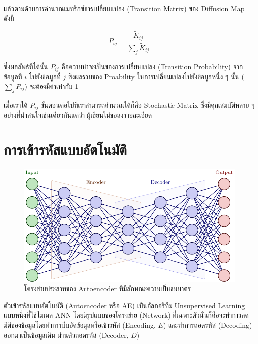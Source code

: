 \noindent แล้วตามด้วยการคำนวณเมทริกซ์การเปลี่ยนแปลง (Transition Matrix) ของ Diffusion Map ดังนี้

\begin{equation}
    P_{ij} = \frac{\tilde{K}_{ij}}{\sum_{j}\tilde{K}_{ij}}
\end{equation}

\noindent ซึ่งผลลัพธ์ที่ได้นั้น $P_{ij}$ คือความน่าจะเป็นของการเปลี่ยนแปลง (Transition Probability) จากข้อมูลที่ $i$ ไปยังข้อมูลที่ 
$j$ ซึ่งผลรวมของ Proability ในการเปลี่ยนแปลงไปยังข้อมูลหนึ่ง ๆ นั้น ($\sum_{j}P_{ij}$) จะต้องมีค่าเท่ากับ 1 

เมื่อเราได้ $P_{ij}$ ขั้นตอนต่อไปที่เราสามารถคำนวณได้ก็คือ Stochastic Matrix ซึ่งมีคุณสมบัติหลาย ๆ อย่างที่น่าสนใจเช่นเดียวกันแต่ว่า%
ผู้เขียนไม่ขอลงรายละเอียด 

\section{การเข้ารหัสแบบอัตโนมัติ}
\label{sec:autoencoder}

\begin{figure}[htbp]
    \centering
    \includegraphics[width=\linewidth]{fig/autoencoder.pdf}
    \caption{โครงข่ายประสาทของ Autoencoder ที่มีลักษณะความเป็นสมมาตร}
    \label{fig:autoencoder}
\end{figure}

ตัวเข้ารหัสแบบอัตโนมัติ (Autoencoder หรือ AE)\autocite{kramer1991} เป็นอัลกอริทึม Unsupervised Learning แบบหนึ่งที่ใช้โมเดล 
ANN โดยมีรูปแบบของโครงข่าย (Network) ที่เฉพาะตัวนั่นก็คือจะทำการลดมิติของข้อมูลโดยทำการบีบอัดข้อมูลหรือเข้ารหัส (Encoding, $E$) 
และทำการถอดรหัส (Decoding) ออกมาเป็นข้อมูลเดิม\autocite{ballard1987} ผ่านตัวถอดรหัส (Decoder, $D$) 

